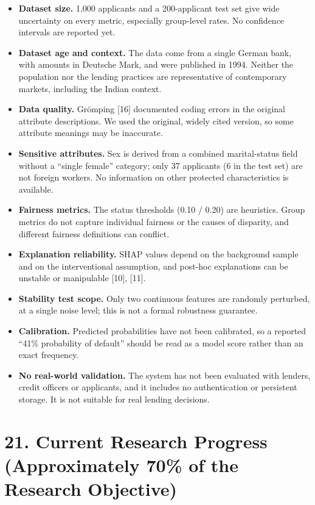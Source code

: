 \documentclass[
  11pt,
]{article}
\providecommand{\tightlist}{%
  \setlength{\itemsep}{0pt}\setlength{\parskip}{0pt}}
\begin{document}
\begin{itemize}
\tightlist
\item
  \textbf{Dataset size.} 1,000 applicants and a 200-applicant test set
  give wide uncertainty on every metric, especially group-level rates.
  No confidence intervals are reported yet.
\item
  \textbf{Dataset age and context.} The data come from a single German
  bank, with amounts in Deutsche Mark, and were published in 1994.
  Neither the population nor the lending practices are representative of
  contemporary markets, including the Indian context.
\item
  \textbf{Data quality.} Grömping {[}16{]} documented coding errors in
  the original attribute descriptions. We used the original, widely
  cited version, so some attribute meanings may be inaccurate.
\item
  \textbf{Sensitive attributes.} Sex is derived from a combined
  marital-status field without a ``single female'' category; only 37
  applicants (6 in the test set) are not foreign workers. No information
  on other protected characteristics is available.
\item
  \textbf{Fairness metrics.} The status thresholds (0.10 / 0.20) are
  heuristics. Group metrics do not capture individual fairness or the
  causes of disparity, and different fairness definitions can conflict.
\item
  \textbf{Explanation reliability.} SHAP values depend on the background
  sample and on the interventional assumption, and post-hoc explanations
  can be unstable or manipulable {[}10{]}, {[}11{]}.
\item
  \textbf{Stability test scope.} Only two continuous features are
  randomly perturbed, at a single noise level; this is not a formal
  robustness guarantee.
\item
  \textbf{Calibration.} Predicted probabilities have not been
  calibrated, so a reported ``41\% probability of default'' should be
  read as a model score rather than an exact frequency.
\item
  \textbf{No real-world validation.} The system has not been evaluated
  with lenders, credit officers or applicants, and it includes no
  authentication or persistent storage. It is not suitable for real
  lending decisions.
\end{itemize}

\hypertarget{current-research-progress-approximately-70-of-the-research-objective}{%
\section{21. Current Research Progress (Approximately 70\% of the
Research
Objective)}\label{current-research-progress-approximately-70-of-the-research-objective}}
\end{document}
